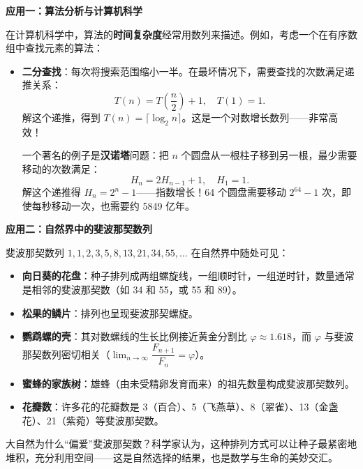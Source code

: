 \documentclass[fontset=fandol]{ctexart}
\newenvironment{custom}[1]{\par\noindent\textbf{#1}\quad}{\par\vspace{0.8em}}
\begin{document}
\begin{custom}{应用一：算法分析与计算机科学}

在计算机科学中，算法的\textbf{时间复杂度}经常用数列来描述。例如，考虑一个在有序数组中查找元素的算法：

\begin{itemize}
\item \textbf{二分查找}：每次将搜索范围缩小一半。在最坏情况下，需要查找的次数满足递推关系：
\[
T(n) = T\left(\dfrac{n}{2}\right) + 1,\quad T(1) = 1.
\]
解这个递推，得到 \(T(n) = \lceil \log_2 n \rceil\)。这是一个对数增长数列——非常高效！


一个著名的例子是\textbf{汉诺塔}问题：把 \(n\) 个圆盘从一根柱子移到另一根，最少需要移动的次数满足：
\[
H_n = 2H_{n-1} + 1,\quad H_1 = 1.
\]
解这个递推得 \(H_n = 2^n - 1\)——指数增长！64 个圆盘需要移动 \(2^{64}-1\) 次，即使每秒移动一次，也需要约 5849 亿年。
\end{itemize}
\end{custom}

\begin{custom}{应用二：自然界中的斐波那契数列}

斐波那契数列 \(1, 1, 2, 3, 5, 8, 13, 21, 34, 55, \ldots\) 在自然界中随处可见：

\begin{itemize}
\item \textbf{向日葵的花盘}：种子排列成两组螺旋线，一组顺时针，一组逆时针，数量通常是相邻的斐波那契数（如 34 和 55，或 55 和 89）。
\item \textbf{松果的鳞片}：排列也呈现斐波那契螺旋。
\item \textbf{鹦鹉螺的壳}：其对数螺线的生长比例接近黄金分割比 \(\varphi \approx 1.618\)，而 \(\varphi\) 与斐波那契数列密切相关（\(\lim_{n\to\infty} \dfrac{F_{n+1}}{F_n} = \varphi\)）。
\item \textbf{蜜蜂的家族树}：雄蜂（由未受精卵发育而来）的祖先数量构成斐波那契数列。
\item \textbf{花瓣数}：许多花的花瓣数是 3（百合）、5（飞燕草）、8（翠雀）、13（金盏花）、21（紫菀）等斐波那契数。
\end{itemize}

\begin{center}
\end{center}

大自然为什么“偏爱”斐波那契数？科学家认为，这种排列方式可以让种子最紧密地堆积，充分利用空间——这是自然选择的结果，也是数学与生命的美妙交汇。
\end{custom}
\end{document}
